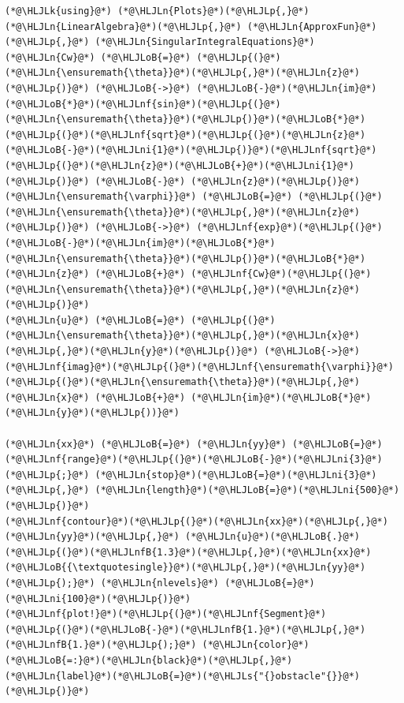 \documentclass[12pt,a4paper]{article}
\newcommand{\HLJLk}[1]{\textcolor[RGB]{148,91,176}{\textbf{#1}}}
\newcommand{\HLJLn}[1]{#1}
\newcommand{\HLJLnf}[1]{\textcolor[RGB]{66,102,213}{#1}}
\newcommand{\HLJLs}[1]{\textcolor[RGB]{201,61,57}{#1}}
\newcommand{\HLJLnfB}[1]{\textcolor[RGB]{59,151,46}{#1}}
\newcommand{\HLJLni}[1]{\textcolor[RGB]{59,151,46}{#1}}
\newcommand{\HLJLoB}[1]{\textcolor[RGB]{102,102,102}{\textbf{#1}}}
\newcommand{\HLJLp}[1]{#1}
\begin{document}
\begin{lstlisting}
(*@\HLJLk{using}@*) (*@\HLJLn{Plots}@*)(*@\HLJLp{,}@*) (*@\HLJLn{LinearAlgebra}@*)(*@\HLJLp{,}@*) (*@\HLJLn{ApproxFun}@*)(*@\HLJLp{,}@*) (*@\HLJLn{SingularIntegralEquations}@*)
(*@\HLJLn{Cw}@*) (*@\HLJLoB{=}@*) (*@\HLJLp{(}@*)(*@\HLJLn{\ensuremath{\theta}}@*)(*@\HLJLp{,}@*)(*@\HLJLn{z}@*)(*@\HLJLp{)}@*) (*@\HLJLoB{->}@*) (*@\HLJLoB{-}@*)(*@\HLJLn{im}@*)(*@\HLJLoB{*}@*)(*@\HLJLnf{sin}@*)(*@\HLJLp{(}@*)(*@\HLJLn{\ensuremath{\theta}}@*)(*@\HLJLp{)}@*)(*@\HLJLoB{*}@*)(*@\HLJLp{(}@*)(*@\HLJLnf{sqrt}@*)(*@\HLJLp{(}@*)(*@\HLJLn{z}@*)(*@\HLJLoB{-}@*)(*@\HLJLni{1}@*)(*@\HLJLp{)}@*)(*@\HLJLnf{sqrt}@*)(*@\HLJLp{(}@*)(*@\HLJLn{z}@*)(*@\HLJLoB{+}@*)(*@\HLJLni{1}@*)(*@\HLJLp{)}@*) (*@\HLJLoB{-}@*) (*@\HLJLn{z}@*)(*@\HLJLp{)}@*)
(*@\HLJLn{\ensuremath{\varphi}}@*) (*@\HLJLoB{=}@*) (*@\HLJLp{(}@*)(*@\HLJLn{\ensuremath{\theta}}@*)(*@\HLJLp{,}@*)(*@\HLJLn{z}@*)(*@\HLJLp{)}@*) (*@\HLJLoB{->}@*) (*@\HLJLnf{exp}@*)(*@\HLJLp{(}@*)(*@\HLJLoB{-}@*)(*@\HLJLn{im}@*)(*@\HLJLoB{*}@*)(*@\HLJLn{\ensuremath{\theta}}@*)(*@\HLJLp{)}@*)(*@\HLJLoB{*}@*)(*@\HLJLn{z}@*) (*@\HLJLoB{+}@*) (*@\HLJLnf{Cw}@*)(*@\HLJLp{(}@*)(*@\HLJLn{\ensuremath{\theta}}@*)(*@\HLJLp{,}@*)(*@\HLJLn{z}@*)(*@\HLJLp{)}@*)
(*@\HLJLn{u}@*) (*@\HLJLoB{=}@*) (*@\HLJLp{(}@*)(*@\HLJLn{\ensuremath{\theta}}@*)(*@\HLJLp{,}@*)(*@\HLJLn{x}@*)(*@\HLJLp{,}@*)(*@\HLJLn{y}@*)(*@\HLJLp{)}@*) (*@\HLJLoB{->}@*) (*@\HLJLnf{imag}@*)(*@\HLJLp{(}@*)(*@\HLJLnf{\ensuremath{\varphi}}@*)(*@\HLJLp{(}@*)(*@\HLJLn{\ensuremath{\theta}}@*)(*@\HLJLp{,}@*) (*@\HLJLn{x}@*) (*@\HLJLoB{+}@*) (*@\HLJLn{im}@*)(*@\HLJLoB{*}@*)(*@\HLJLn{y}@*)(*@\HLJLp{))}@*)

(*@\HLJLn{xx}@*) (*@\HLJLoB{=}@*) (*@\HLJLn{yy}@*) (*@\HLJLoB{=}@*) (*@\HLJLnf{range}@*)(*@\HLJLp{(}@*)(*@\HLJLoB{-}@*)(*@\HLJLni{3}@*)(*@\HLJLp{;}@*) (*@\HLJLn{stop}@*)(*@\HLJLoB{=}@*)(*@\HLJLni{3}@*) (*@\HLJLp{,}@*) (*@\HLJLn{length}@*)(*@\HLJLoB{=}@*)(*@\HLJLni{500}@*)(*@\HLJLp{)}@*)
(*@\HLJLnf{contour}@*)(*@\HLJLp{(}@*)(*@\HLJLn{xx}@*)(*@\HLJLp{,}@*) (*@\HLJLn{yy}@*)(*@\HLJLp{,}@*) (*@\HLJLn{u}@*)(*@\HLJLoB{.}@*)(*@\HLJLp{(}@*)(*@\HLJLnfB{1.3}@*)(*@\HLJLp{,}@*)(*@\HLJLn{xx}@*)(*@\HLJLoB{{\textquotesingle}}@*)(*@\HLJLp{,}@*)(*@\HLJLn{yy}@*)(*@\HLJLp{);}@*) (*@\HLJLn{nlevels}@*) (*@\HLJLoB{=}@*) (*@\HLJLni{100}@*)(*@\HLJLp{)}@*)
(*@\HLJLnf{plot!}@*)(*@\HLJLp{(}@*)(*@\HLJLnf{Segment}@*)(*@\HLJLp{(}@*)(*@\HLJLoB{-}@*)(*@\HLJLnfB{1.}@*)(*@\HLJLp{,}@*)(*@\HLJLnfB{1.}@*)(*@\HLJLp{);}@*) (*@\HLJLn{color}@*)(*@\HLJLoB{=:}@*)(*@\HLJLn{black}@*)(*@\HLJLp{,}@*) (*@\HLJLn{label}@*)(*@\HLJLoB{=}@*)(*@\HLJLs{"{}obstacle"{}}@*)(*@\HLJLp{)}@*)
\end{lstlisting}
\end{document}
